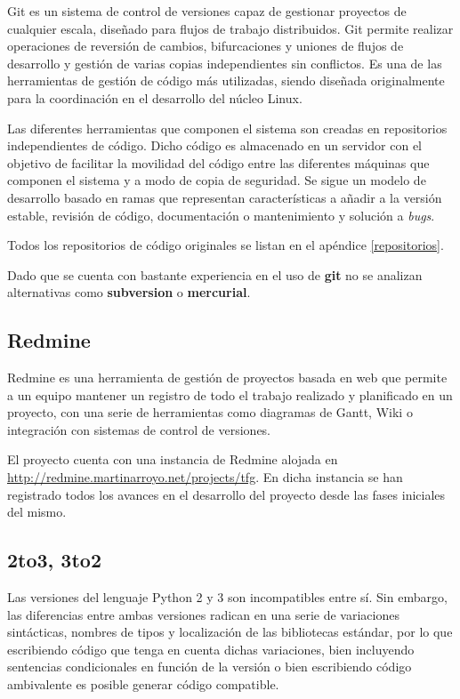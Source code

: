 Git es un sistema de control de versiones capaz de gestionar proyectos de cualquier escala, diseñado para flujos de trabajo distribuidos. Git permite realizar operaciones de reversión de cambios, bifurcaciones y uniones de flujos de desarrollo y gestión de varias copias independientes sin conflictos. Es una de las herramientas de gestión de código más utilizadas, siendo diseñada originalmente para la coordinación en el desarrollo del núcleo Linux.

Las diferentes herramientas que componen el sistema son creadas en repositorios independientes de código. Dicho código es almacenado en un servidor con el objetivo de facilitar la movilidad del código entre las diferentes máquinas que componen el sistema y a modo de copia de seguridad. Se sigue un modelo de desarrollo basado en ramas que representan características a añadir a la versión estable, revisión de código, documentación o mantenimiento y solución a \textit{bugs}.

Todos los repositorios de código originales se listan en el apéndice \ref{repositorios}.

Dado que se cuenta con bastante experiencia en el uso de \textbf{git} no se analizan alternativas como \textbf{subversion} o \textbf{mercurial}. 

\subsection{Redmine}

Redmine es una herramienta de gestión de proyectos basada en web que permite a un equipo mantener un registro de todo el trabajo realizado y planificado en un proyecto, con una serie de herramientas como diagramas de Gantt, Wiki o integración con sistemas de control de versiones.

El proyecto cuenta con una instancia de Redmine alojada en \href{http://redmine.martinarroyo.net/projects/tfg}{http://redmine.martinarroyo.net/projects/tfg}. En dicha instancia se han registrado todos los avances en el desarrollo del proyecto desde las fases iniciales del mismo.

\subsection{2to3, 3to2}

Las versiones del lenguaje Python 2 y 3 son incompatibles entre sí. Sin embargo, las diferencias entre ambas versiones radican en una serie de variaciones sintácticas, nombres de tipos y localización de las bibliotecas estándar, por lo que escribiendo código que tenga en cuenta dichas variaciones, bien incluyendo sentencias condicionales en función de la versión o bien escribiendo código ambivalente es posible generar código compatible.

